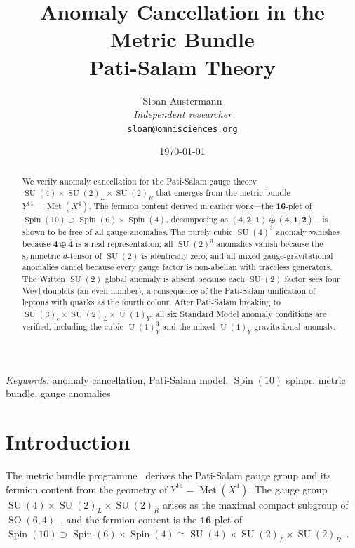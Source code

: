 \documentclass[12pt,a4paper]{article}
\title{\textbf{Anomaly Cancellation in the Metric Bundle\\ Pati-Salam Theory}}
\author{Sloan Austermann\\[4pt]
\small\textit{Independent researcher}\\
\small\texttt{sloan@omnisciences.org}}
\date{\today}
\theoremstyle{definition}
\newcommand{\Met}{\operatorname{Met}}
\newcommand{\SO}{\operatorname{SO}}
\newcommand{\SU}{\operatorname{SU}}
\newcommand{\U}{\operatorname{U}}
\newcommand{\Spin}{\operatorname{Spin}}
\begin{document}
\maketitle

\begin{abstract}
We verify anomaly cancellation for the Pati-Salam gauge theory $\SU(4) \times \SU(2)_L \times \SU(2)_R$ that emerges from the metric bundle $Y^{14} = \Met(X^4)$.
The fermion content derived in earlier work---the $\mathbf{16}$-plet of $\Spin(10) \supset \Spin(6) \times \Spin(4)$, decomposing as $(\mathbf{4}, \mathbf{2}, \mathbf{1}) \oplus (\bar{\mathbf{4}}, \mathbf{1}, \mathbf{2})$---is shown to be free of all gauge anomalies.
The purely cubic $\SU(4)^3$ anomaly vanishes because $\mathbf{4} \oplus \bar{\mathbf{4}}$ is a real representation; all $\SU(2)^3$ anomalies vanish because the symmetric $d$-tensor of $\SU(2)$ is identically zero; and all mixed gauge-gravitational anomalies cancel because every gauge factor is non-abelian with traceless generators.
The Witten $\SU(2)$ global anomaly is absent because each $\SU(2)$ factor sees four Weyl doublets (an even number), a consequence of the Pati-Salam unification of leptons with quarks as the fourth colour.
After Pati-Salam breaking to $\SU(3)_c \times \SU(2)_L \times \U(1)_Y$, all six Standard Model anomaly conditions are verified, including the cubic $\U(1)_Y^3$ and the mixed $\U(1)_Y$-gravitational anomaly.
\end{abstract}

\vspace{10pt}
\noindent\textit{Keywords:} anomaly cancellation, Pati-Salam model, $\Spin(10)$ spinor, metric bundle, gauge anomalies

\newpage
\tableofcontents
\newpage

\section{Introduction}
\label{sec:intro}

The metric bundle programme~\cite{Paper1,Paper2,Paper3} derives the Pati-Salam gauge group and its fermion content from the geometry of $Y^{14} = \Met(X^4)$.
The gauge group $\SU(4) \times \SU(2)_L \times \SU(2)_R$ arises as the maximal compact subgroup of $\SO(6,4)$~\cite{Paper1}, and the fermion content is the $\mathbf{16}$-plet of $\Spin(10) \supset \Spin(6) \times \Spin(4) \cong \SU(4) \times \SU(2)_L \times \SU(2)_R$~\cite{Paper2}.
\end{document}
